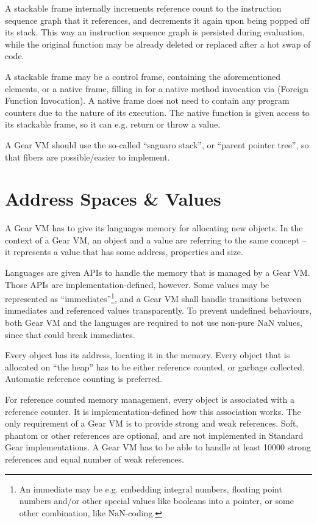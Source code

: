 A stackable frame internally increments reference count to the instruction sequence graph that it references, and decrements it again upon being popped off its stack. This way an instruction sequence graph is persisted during evaluation, while the original function may be already deleted or replaced after a hot swap of code. 

A stackable frame may be a control frame, containing the aforementioned elements, or a native frame, filling in for a native method invocation via  (Foreign Function Invocation). A native frame does not need to contain any program counters due to the nature of its execution. The native function is given access to its stackable frame, so it can e.g. return or throw a value. 

A Gear VM should use the so-called ``saguaro stack'', or ``parent pointer tree'', so that fibers are possible/easier to implement. 





\section{Address Spaces \& Values}

A Gear VM has to give its languages memory for allocating new objects. In the context of a Gear VM, an object and a value are referring to the same concept -- it represents a value that has some address, properties and size. 

Languages are given APIs to handle the memory that is managed by a Gear VM. Those APIs are implementation-defined, however. Some values may be represented as ``immediates''\footnote{An immediate may be e.g. embedding integral numbers, floating point numbers and/or other special values like booleans into a pointer, or some other combination, like NaN-coding.}, and a Gear VM shall handle transitions between immediates and referenced values transparently. To prevent undefined behaviours, both Gear VM and the languages are required to not use non-pure NaN values, since that could break immediates. 

Every object has its address, locating it in the memory. Every object that is allocated on ``the heap'' has to be either reference counted, or garbage collected. Automatic reference counting is preferred. 

For reference counted memory management, every object is associated with a reference counter. It is implementation-defined how this association works. The only requirement of a Gear VM is to provide strong and weak references. Soft, phantom or other references are optional, and are not implemented in Standard Gear implementations. A Gear VM has to be able to handle at least 10000 strong references and equal number of weak references. 

